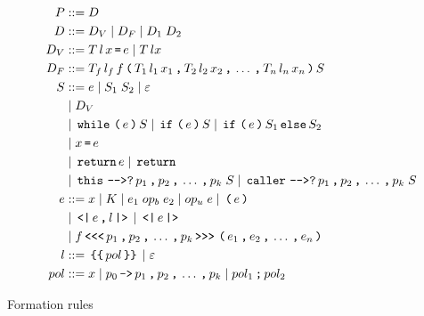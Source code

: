 \begin{table}
  \begin{align*}
    P         & ::= D \\
    D         & ::= D_V \gp D_F \gp D_1 \; D_2 \\
    D_V       & ::= T \, l \, x \tk = e \gp T \, l x \\
    D_F       & ::= T_f \, l_f \, f \tk ( T_1 \, l_1 \, x_1 \tk , T_2 \, l_2 \, x_2 \tk , \dots \tk , T_n \, l_n \, x_n \tk ) S \\
    S         & ::= e \gp S_1 \; S_2 \gp \varepsilon \\
              & \gp D_V \\
              & \gp \tk{while} \tk ( e \tk ) S \gp \tk{if} \tk ( e \tk ) S \gp \tk{if} \tk ( e \tk ) S_1 \tk{else} S_2 \\
              & \gp x \tk = e \\
              & \gp \tk{return} e \gp \tk{return} \\
              & \gp \tk{this} \tk{-{}->?} p_1 \tk , p_2 \tk , \dots \tk , p_k \; S \gp \tk{caller} \tk{-{}->?} p_1 \tk , p_2 \tk , \dots \tk , p_k \; S \\
    e         & ::= x \gp K \gp e_1 \; op_b \; e_2 \gp op_u \; e \gp \tk ( e \tk ) \\
              & \gp \tk{<|} e \tk , l \tk{|>} \gp \tk{<|} e \tk{|>} \\
              & \gp f \tk{<{}<{}<} p_1 \tk , p_2 \tk , \dots \tk , p_k \tk{>{}>{}>} \tk ( e_1 \tk , e_2 \tk , \dots \tk , e_n \tk ) \\
    l         & ::= \tk{\{\{} pol \tk{\}\}} \gp \varepsilon \\
    pol       & ::= x \gp p_0 \tk{->} p_1 \tk , p_2 \tk , \dots \tk , p_k \gp pol_1 \tk ; pol_2
  \end{align*}
  \caption{Formation rules}
  \label{ctif:rules}
\end{table}
